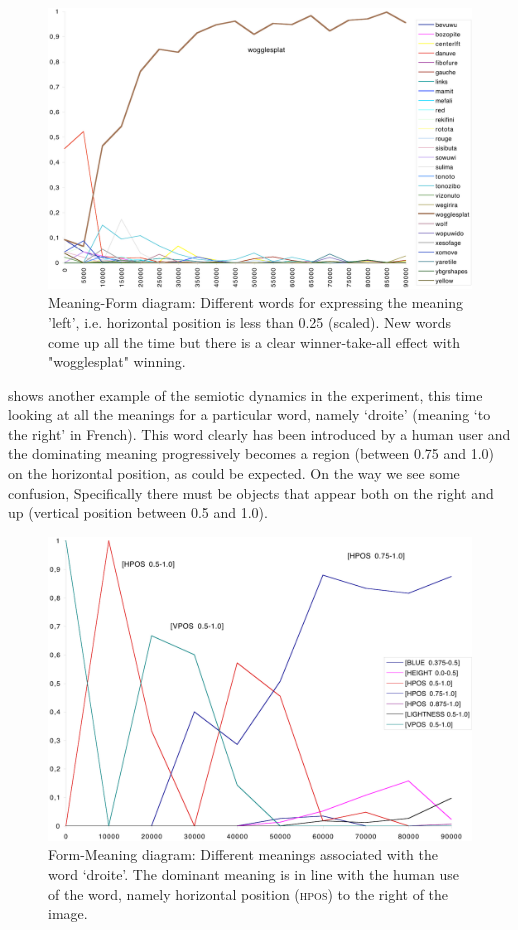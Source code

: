 \begin{figure}[htbp]
  \centerline{\includegraphics[width=\textwidth]{chap8/figures/wogglesplat.pdf}}
\caption{\label{fig:woggle}Meaning-Form diagram: Different words for expressing the meaning 'left', i.e. 
horizontal position is less than 0.25 (scaled). 
New words come up all the time but there is a clear winner-take-all effect with "wogglesplat" winning. 
}
\end{figure}
\enlargethispage{1\baselineskip}
 shows another example of the semiotic dynamics in the experiment, this time looking at all the 
meanings for a particular word, namely `droite' (meaning `to the right' in French). This word clearly has been introduced
by a human user and the dominating meaning progressively becomes a region (between 0.75 and 1.0) on the horizontal position, 
as could be expected. On the way we see some confusion, Specifically there must be objects that appear both on the right 
and up (vertical position between 0.5 and 1.0). 

\begin{figure}[htbp]
  \centerline{\includegraphics[width=\textwidth]{chap8/figures/droite.pdf}}
\caption{\label{fig:droite}Form-Meaning diagram: Different meanings associated with the word `droite'. The dominant meaning is 
in line with the human use of the word, namely horizontal position (\textsc{hpos}) to the right of the image.}
\end{figure}

